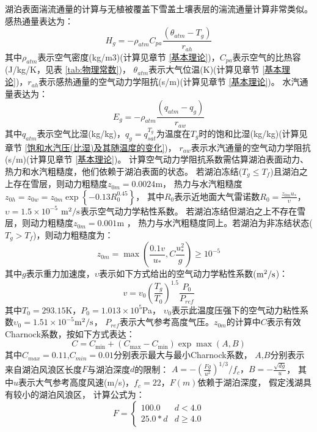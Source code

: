 湖泊表面湍流通量的计算与无植被覆盖下雪盖土壤表层的湍流通量计算非常类似。感热通量表达为：
\begin{equation}
H_{g}=-\rho_{atm} C_{p a} \frac{\left(\theta_{atm}-T_{g}\right)}{r_{a h}}
\end{equation}
其中$\rho_{atm}$表示空气密度(kg/m3)(计算见章节 \ref{基本理论})，$C_{pa}$表示空气的比热容(J/kg/K，见表 \ref{tab:物理常数})，
$\theta_{atm}$表示大气位温(K)(计算见章节 \ref{基本理论})，$r_{ah}$表示感热通量的空气动力学阻抗(s/m)(计算见章节 \ref{基本理论})。
水汽通量表达为：
\begin{equation}
E_{g}=-\rho_{atm} \frac{\left(q_{atm}-q_{g}\right)}{r_{a w}}
\end{equation}
其中$q_{atm}$表示空气比湿(kg/kg)，$q_g=q_{sat}^{T_g}$为温度在$T_g$时的饱和比湿(kg/kg)(计算见章节 \ref{饱和水汽压(比湿)及其随温度的变化})，
$r_{aw}$表示水汽通量的空气动力学阻抗(s/m)(计算见章节 \ref{基本理论})。
计算空气动力学阻抗系数需估算湖泊表面动力、热力和水汽粗糙度，他们依赖于湖泊表面的状态。
若湖泊冻结($T_g\le T_f$)且湖泊之上存在雪层，则动力粗糙度$z_{0m}=0.0024$m，
热力与水汽粗糙度$z_{0h}=z_{0w}=z_{0m}\exp{\left\{-0.13R_0^{0.45}\right\}}$\citep{zilitinkevich1972dynamics}，
其中$R_0$表示近地面大气雷诺数$R_0=\frac{z_{0m}u_\ast}{\upsilon}$，
$\upsilon=1.5\times{10}^{-5}$ $\rm m^2/s$表示空气动力学粘性系数。
若湖泊冻结但湖泊之上不存在雪层，则动力粗糙度$z_{0m}=0.001$m \citep{subin2012improved}，
热力与水汽粗糙度同上。若湖泊为非冻结状态($T_g>T_f$)，则动力粗糙度为\citep{subin2012improved}：
\begin{equation}
z_{0 m}=\max \left(\frac{0.1 v}{u_{*}}, C \frac{u_{*}^{2}}{g}\right) \geq 10^{-5}
\end{equation}
其中$g$表示重力加速度，$\upsilon$表示如下方式给出的空气动力学粘性系数($\rm m^2/s$)：
\begin{equation}
v=v_{0}\left(\frac{T_{g}}{T_{0}}\right)^{1.5} \frac{P_{0}}{P_{r e f}}
\end{equation}
其中$T_0=293.15$K，$P_0=1.013\times{10}^5$Pa，
$\upsilon_0$表示此温度压强下的空气动力粘性系数$\upsilon_0=1.51\times{10}^{-5}$$\rm m^2/s$，
$P_{ref}$表示大气参考高度气压。$z_{0m}$的计算中$C$表示有效Charnock系数，按如下方式表达：
\begin{equation}
C=C_{\min }+\left(C_{\max }-C_{\min }\right) \exp \max (A, B)
\end{equation}
其中$C_{max}=0.11$,$C_{min}=0.01$分别表示最大与最小Charnock系数，
$A$,$B$分别表示来自湖泊风浪区长度$F$与湖泊深度$d$的限制：
$A=-\left(\frac{Fg}{u^2}\right)^{1/3}/f_c，B=-\frac{\sqrt{dg}}{u}$，
其中$u$表示大气参考高度风速(m/s)，$f_c=22$，$F(m)$依赖于湖泊深度，
假定浅湖具有较小的湖泊风浪区，
计算公式为：$$F=\left\{\begin{array}{ll}100.0 & d<4.0 \\ 25.0 * d & d \geq 4.0\end{array}\right.$$


